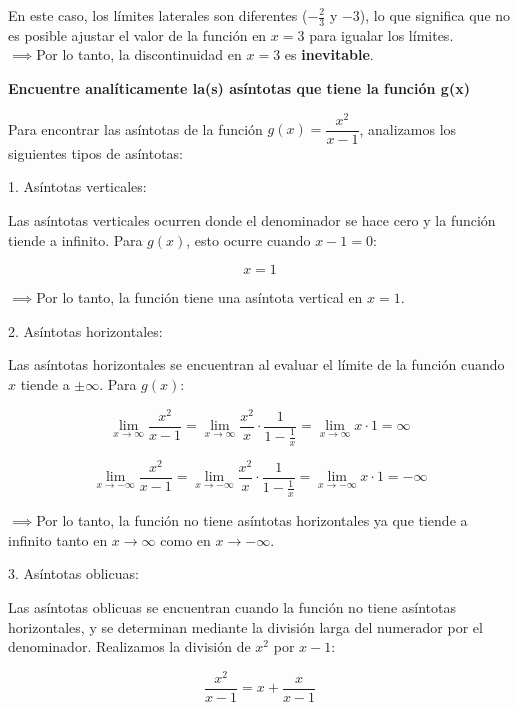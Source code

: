 \documentclass[answers]{exam} %
\begin{document}
\begin{questions}
\begin{solution}
		En este caso, los límites laterales son diferentes (\(-\frac{2}{3}\) y \(-3\)), lo que significa que no es posible ajustar el valor de la función en \( x = 3 \) para igualar los límites.\\[10pt]
		$\implies$Por lo tanto, la discontinuidad en \( x = 3 \) es \textbf{inevitable}.


	\end{solution}



	\vspace{0.5cm}

	\question \large\textbf{Encuentre analíticamente la(s) asíntotas que tiene la función g(x)}
	\begin{solution}
		Para encontrar las asíntotas de la función \( g(x) = \dfrac{x^2}{x-1} \), analizamos los siguientes tipos de asíntotas:

		1. Asíntotas verticales:

		Las asíntotas verticales ocurren donde el denominador se hace cero y la función tiende a infinito. Para \( g(x) \), esto ocurre cuando \( x - 1 = 0 \):

		\[
			x = 1
		\]

		$\implies$Por lo tanto, la función tiene una asíntota vertical en \( x = 1 \).

		2. Asíntotas horizontales:

		Las asíntotas horizontales se encuentran al evaluar el límite de la función cuando \( x \) tiende a \( \pm\infty \). Para \( g(x) \):

		\[
			\lim_{{x \to \infty}} \frac{x^2}{x-1} = \lim_{{x \to \infty}} \frac{x^2}{x} \cdot \frac{1}{1 - \frac{1}{x}} = \lim_{{x \to \infty}} x \cdot 1 = \infty
		\]

		\[
			\lim_{{x \to -\infty}} \frac{x^2}{x-1} = \lim_{{x \to -\infty}} \frac{x^2}{x} \cdot \frac{1}{1 - \frac{1}{x}} = \lim_{{x \to -\infty}} x \cdot 1 = -\infty
		\]

		$\implies$Por lo tanto, la función no tiene asíntotas horizontales ya que tiende a infinito tanto en \( x \to \infty \) como en \( x \to -\infty \).

		3. Asíntotas oblicuas:

		Las asíntotas oblicuas se encuentran cuando la función no tiene asíntotas horizontales, y se determinan mediante la división larga del numerador por el denominador. Realizamos la división de \( x^2 \) por \( x-1 \):

		\[
			\frac{x^2}{x-1} = x + \frac{x}{x-1}
		\]


\end{solution}
\end{questions}
\end{document}
